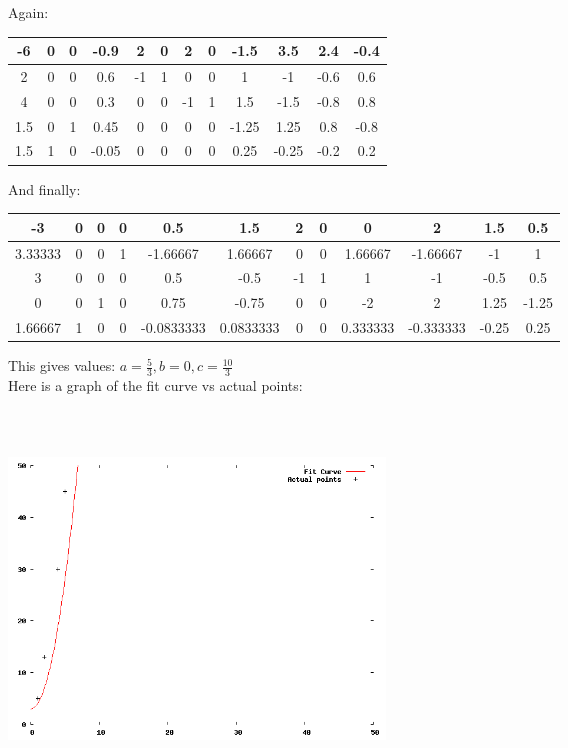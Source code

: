 \documentclass[a4paper,12pt]{article}
\begin{document}
Again:
\begin{center}
\begin{tabular}{| c | c  c  c  c  c  c  c  c  c  c  c |}
\hline
-6 & 0 & 0 & -0.9 & 2 & 0 & 2 & 0 & -1.5 & 3.5 & 2.4 & -0.4\\
\hline
2 & 0 & 0 & 0.6 & -1 & 1 & 0 & 0 & 1 & -1 & -0.6 & 0.6\\
4 & 0 & 0 & 0.3 & 0 & 0 & -1 & 1 & 1.5 & -1.5 & -0.8 & 0.8\\
1.5 & 0 & 1 & 0.45 & 0 & 0 & 0 & 0 & -1.25 & 1.25 & 0.8 & -0.8\\
1.5 & 1 & 0 & -0.05 & 0 & 0 & 0 & 0 & 0.25 & -0.25 & -0.2 & 0.2\\
\hline
\end{tabular}
\end{center}
And finally:
\begin{center}
\begin{tabular}{| c | c  c  c  c  c  c  c  c  c  c  c |}
\hline
-3 & 0 & 0 & 0 & 0.5 & 1.5 & 2 & 0 & 0 & 2 & 1.5 & 0.5\\
\hline
3.33333 & 0 & 0 & 1 & -1.66667 & 1.66667 & 0 & 0 & 1.66667 & -1.66667 & -1 & 1\\
3 & 0 & 0 & 0 & 0.5 & -0.5 & -1 & 1 & 1 & -1 & -0.5 & 0.5\\
0 & 0 & 1 & 0 & 0.75 & -0.75 & 0 & 0 & -2 & 2 & 1.25 & -1.25\\
1.66667 & 1 & 0 & 0 & -0.0833333 & 0.0833333 & 0 & 0 & 0.333333 & -0.333333 & -0.25 & 0.25\\
\hline
\end{tabular}
\end{center}
This gives values: \(a=\frac{5}{3}, b=0, c=\frac{10}{3} \)\\
Here is a graph of the fit curve vs actual points: \\
\begin{center}
  \includegraphics[width=10cm, height=10cm, keepaspectratio=true]{315.png}
\end{center}
\end{document}
